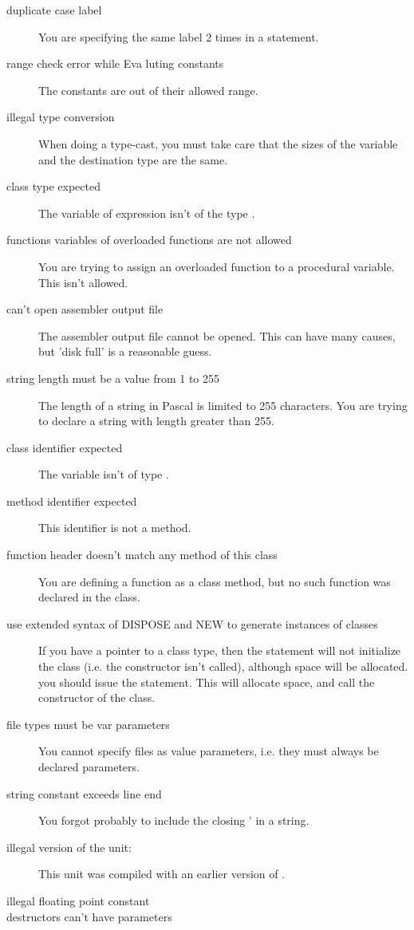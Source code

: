 \documentclass{report}
\begin{document}
\begin{description}
\item [duplicate case label]
You are specifying the same label 2 times in a  statement.
\item [range check error while Eva luting constants]
The constants are out of their allowed range.
\item [illegal type conversion]
When doing a type-cast, you must take care that the sizes of the variable and
the destination type are the same. 
\item [class type expected]
The variable of expression isn't of the type .
\item [functions variables of overloaded functions are not allowed]
You are trying to assign an overloaded function to a procedural variable.
This isn't allowed.
\item [can't open assembler output file]
The assembler output file cannot be opened. This can have many causes, but
'disk full' is a reasonable guess.
\item [string length must be a value from 1 to 255]
The length of a string in Pascal is limited to 255 characters. You are
trying to declare a string with length greater than 255.
\item [class identifier expected]
The variable isn't of type .
\item [method identifier expected]
This identifier is not a method.
\item [function header doesn't match any method of this class]
You are defining a function as a class method, but no such function was
declared in the class.
\item [use extended syntax of DISPOSE and NEW to generate instances of classes]
If you have a pointer  to a class type, then the statement
 will not initialize the class (i.e. the constructor isn't
called), although space will be allocated. you should issue the
 statement. This will allocate space, and call the
constructor of the class.
\item [file types must be var parameters]
You cannot specify files as value parameters, i.e. they must always be
declared  parameters.
\item [string constant exceeds line end]
You forgot probably to include the closing ' in a string. 
\item [illegal version of the unit:]
This unit was compiled with an earlier version of \fpk.
\item [illegal floating point constant]
\item [destructors can't have parameters]

\end{description}
\end{document}
